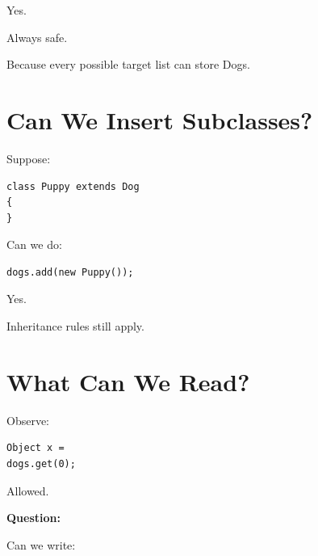 \documentclass[11pt,a4paper]{book}
\begin{document}

Yes.


Always safe.


Because every possible target list
can store Dogs.


\section{Can We Insert Subclasses?}

Suppose:

\begin{verbatim} 
class Puppy extends Dog
{
}
\end{verbatim}


Can we do:

\begin{verbatim} 
dogs.add(new Puppy());
\end{verbatim}


Yes.


Inheritance rules still apply.


\section{What Can We Read?}

Observe:

\begin{verbatim} 
Object x =
dogs.get(0);
\end{verbatim}


Allowed.


\textbf{Question:}

Can we write:
\end{document}
